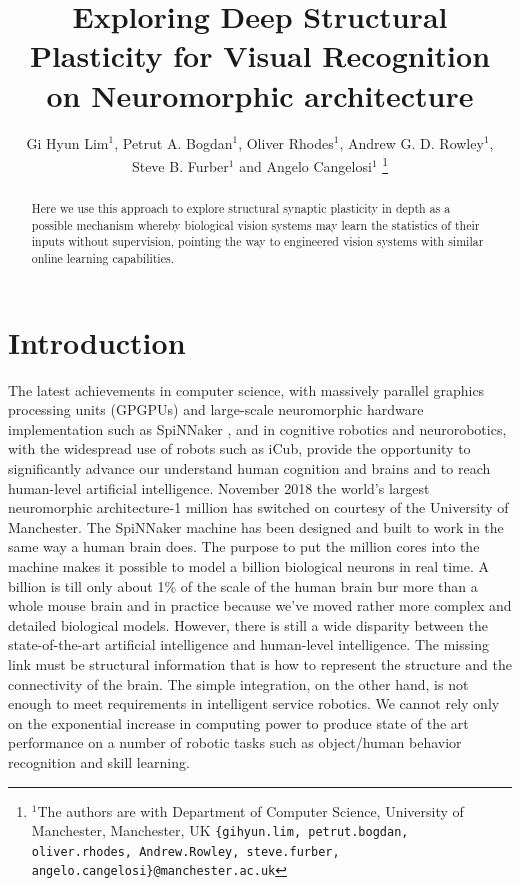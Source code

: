 \documentclass[letterpaper, 10 pt, conference]{ieeeconf}  %
\title{Exploring Deep Structural Plasticity for Visual Recognition on Neuromorphic architecture}
\author{Gi Hyun Lim$^{1}$, Petrut A. Bogdan$^{1}$, Oliver Rhodes$^{1}$, Andrew G. D. Rowley$^{1}$, \\ 
         Steve B. Furber$^{1}$ and Angelo Cangelosi$^{1}$%
\thanks{$^{1}$The authors are with Department of Computer Science, University of Manchester, Manchester, UK
{\tt\small \{gihyun.lim, petrut.bogdan, oliver.rhodes, Andrew.Rowley, steve.furber, angelo.cangelosi\}@manchester.ac.uk}}%
}
\begin{document}
\maketitle
\thispagestyle{empty}
\pagestyle{empty}


\begin{abstract}
Here we use this approach to explore structural synaptic plasticity in depth as a possible mechanism whereby biological vision systems may learn the statistics of their inputs without supervision, pointing the way to engineered vision systems with similar online learning capabilities.
\end{abstract}

\section{Introduction}

The latest achievements in computer science, with massively parallel graphics processing units (GPGPUs) and large-scale neuromorphic hardware implementation such as SpiNNaker \cite{Furber2020}, and in cognitive robotics and neurorobotics, with the widespread use of robots such as iCub, provide the opportunity to significantly advance our understand human cognition and brains and to reach human-level artificial intelligence. 
November 2018 the world’s largest neuromorphic architecture-1 million \cite{brown2018spinnaker} has switched on courtesy of the University of Manchester.
The SpiNNaker machine has been designed and built to work in the same way a human brain does.
The purpose to put the million cores into the machine makes it possible to model a billion biological neurons in real time.
A billion is till only about 1\% of the scale of the human brain bur more than a whole mouse brain and in practice because we’ve moved rather more complex and detailed biological models.
However, there is still a wide disparity between the state-of-the-art artificial intelligence and human-level intelligence.
The missing link must be structural information that is how to represent the structure and the connectivity of the brain.
The simple integration, on the other hand, is not enough to meet requirements in intelligent service robotics.
We cannot rely only on the exponential increase in computing power to produce state of the art performance on a number of robotic tasks such as object/human behavior recognition and skill learning.
\end{document}

